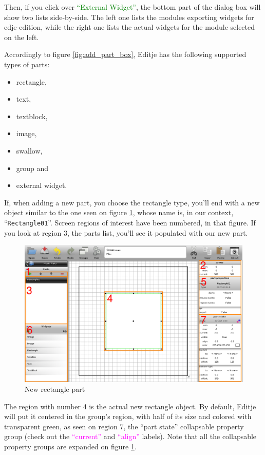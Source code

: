 \documentclass[a4paper]{profusion}
\newcommand{\GUIButton}[1]{\textcolor{green}{#1}} %
\newcommand{\GUILabel}[1]{\textcolor{magenta}{#1}}
\begin{document}
Then, if you click over \GUIButton{``External Widget''}, the bottom
part of the dialog box will show two lists side-by-side. The left one
lists the modules exporting widgets for edje-edition, while the right
one lists the actual widgets for the module selected on the left.

Accordingly to figure \ref{fig:add_part_box}, Editje has the following
supported types of parts:

\begin{itemize}
  \item rectangle,
  \item text,
  \item textblock,
  \item image,
  \item swallow,
  \item group and
  \item external widget.
\end{itemize}

If, when adding a new part, you choose the rectangle type, you'll end
with a new object similar to the one seen on figure
\ref{fig:new_rectangle}, whose name is, in our context,
``\texttt{Rectangle01}''. Screen regions of interest have been
numbered, in that figure. If you look at region 3, the parts list,
you'll see it populated with our new part.

\begin{figure}[h!]
  \centering
  \includegraphics[width=1.0\textwidth]{images/new_rectangle_numbers.png}
  \caption{New rectangle part}
  \label{fig:new_rectangle}
\end{figure}

The region with number 4 is the actual new rectangle object. By
default, Editje will put it centered in the group's region, with half
of its size and colored with transparent green, as seen on region 7,
the ``part state'' collapsable property group (check out the
\GUILabel{``current''} and \GUILabel{``align''} labels). Note that all
the collapsable property groups are expanded on figure
\ref{fig:new_rectangle}.
\end{document}
